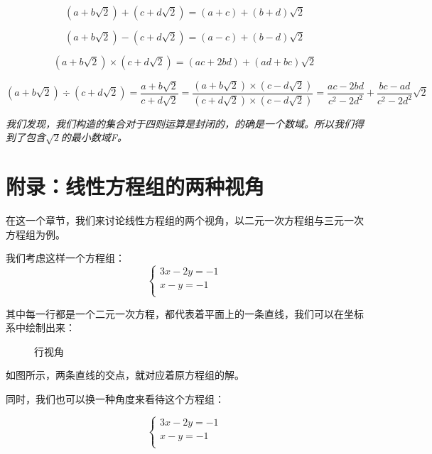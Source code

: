 \documentclass[a4paper]{ctexart}
\begin{document}
$$
(a+b\sqrt{2})+(c+d\sqrt{2})=(a+c)+(b+d)\sqrt{2}
$$

$$
(a+b\sqrt{2})-(c+d\sqrt{2})=(a-c)+(b-d)\sqrt{2}
$$

$$
(a+b\sqrt{2})\times(c+d\sqrt{2})=(ac+2bd)+(ad+bc)\sqrt{2}
$$

$$
(a+b\sqrt{2})\div(c+d\sqrt{2})=\frac{a+b\sqrt{2}}{c+d\sqrt{2}}=\frac{(a+b\sqrt{2})\times(c-d\sqrt{2})}{(c+d\sqrt{2})\times(c-d\sqrt{2})}=\frac{ac-2bd}{c^2-2d^2}+\frac{bc-ad}{c^2-2d^2}\sqrt{2}
$$

\textit{我们发现，我们构造的集合对于四则运算是封闭的，的确是一个数域。所以我们得到了包含$\sqrt{2}$的最小数域F。}

\section{附录：线性方程组的两种视角}
在这一个章节，我们来讨论线性方程组的两个视角，以二元一次方程组与三元一次方程组为例。


我们考虑这样一个方程组：
$$
\begin{cases}
3x-2y=-1\\
x-y=-1\\
\end{cases}
$$

其中每一行都是一个二元一次方程，都代表着平面上的一条直线，我们可以在坐标系中绘制出来：

\begin{figure}[htp]
\centering
{}
\caption{行视角}
\end{figure}

如图所示，两条直线的交点，就对应着原方程组的解。

同时，我们也可以换一种角度来看待这个方程组：

$$
\begin{cases}
3x-2y=-1\\
x-y=-1\\
\end{cases}
$$
\end{document}
